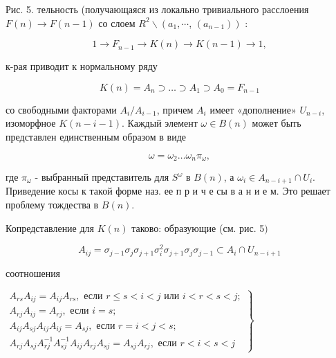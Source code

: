 \documentclass[10pt]{article}
\begin{document}
Рис. 5. тельность (получающаяся из локально тривиального расслоения $F(n) \rightarrow F(n-1)$ со слоем $R^{2} \backslash\left(a_{1}, \cdots\right.$, $\left.\left(a_{n-1}\right)\right)$ :



\[

1 \rightarrow F_{n-1} \rightarrow K(n) \rightarrow K(n-1) \rightarrow 1,

\]



к-рая приводит к нормальному ряду



\[

K(n)=A_{n} \supset \ldots \supset A_{1} \supset A_{0}=F_{n-1}

\]



со свободными факторами $A_{i} / A_{i-1}$, причем $A_{i}$ имеет «дополнение» $U_{n-i}$, изоморфное $K(n-i-1)$. Каждый элемент $\omega \in B(n)$ может быть представлен единственным образом в виде



\[

\omega=\omega_{2} \ldots \omega_{n} \pi_{\omega},

\]



где $\pi_{\omega}$ - выбранный представитель для $S^{\omega}$ в $B(n)$, а $\omega_{i} \in A_{n-i+1} \cap U_{i}$. Приведение косы к такой форме наз. ее п р и ч е сы в а н и е м. Это решает проблему тождества в $B(n)$.



Копредставление для $K(n)$ таково: образующие (см. рис. 5$)$



\[

A_{i j}=\sigma_{j-1} \sigma_{j} \sigma_{j+1} \sigma_{i}^{2} \sigma_{j+1} \sigma_{j} \sigma_{j-1} \subset A_{i} \cap U_{n-i+1}

\]



соотношения



$\left.\begin{array}{l}A_{r s} A_{i j}=A_{i j} A_{r s}, \text { если } r \leqslant s<i<j \text { или } i<r<s<j ; \\ A_{r j} A_{i j}=A_{r j}, \text { если } i=s ; \\ A_{i j} A_{s j} A_{i j} A_{i j}=A_{s j}, \text { если } r=i<j<s ; \\ A_{r j} A_{s j} A_{r j}^{-1} A_{s j}^{-1} A_{i j} A_{r j} A_{s j}=A_{s j} A_{r j}, \text { если } r<i<s<j\end{array}\right\}$
\end{document}

